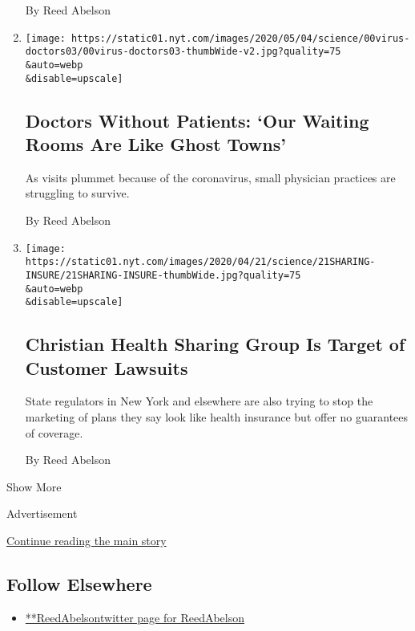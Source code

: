 \begin{enumerate}
  By Reed Abelson
\item
  \href{/2020/05/05/health/coronavirus-primary-care-doctor.html}{}

  \texttt{[image: https://static01.nyt.com/images/2020/05/04/science/00virus-doctors03/00virus-doctors03-thumbWide-v2.jpg?quality=75\\\&auto=webp\\\&disable=upscale]}

  \hypertarget{doctors-without-patients-our-waiting-rooms-are-like-ghost-towns}{%
  \subsection{Doctors Without Patients: `Our Waiting Rooms Are Like
  Ghost
  Towns'}\label{doctors-without-patients-our-waiting-rooms-are-like-ghost-towns}}

  As visits plummet because of the coronavirus, small physician
  practices are struggling to survive.

  By Reed Abelson
\item
  \href{/2020/04/21/health/christian-ministries-insurance-lawsuits.html}{}

  \texttt{[image: https://static01.nyt.com/images/2020/04/21/science/21SHARING-INSURE/21SHARING-INSURE-thumbWide.jpg?quality=75\\\&auto=webp\\\&disable=upscale]}

  \hypertarget{christian-health-sharing-group-is-target-of-customer-lawsuits}{%
  \subsection{Christian Health Sharing Group Is Target of Customer
  Lawsuits}\label{christian-health-sharing-group-is-target-of-customer-lawsuits}}

  State regulators in New York and elsewhere are also trying to stop the
  marketing of plans they say look like health insurance but offer no
  guarantees of coverage.

  By Reed Abelson
\end{enumerate}

Show More

Advertisement

\protect\hyperlink{after-mid2}{Continue reading the main story}

\hypertarget{follow-elsewhere}{%
\subsection{Follow Elsewhere}\label{follow-elsewhere}}

\begin{itemize}
\tightlist
\item
  \href{https://twitter.com/ReedAbelson}{**ReedAbelsontwitter page for
  ReedAbelson}
\end{itemize}

